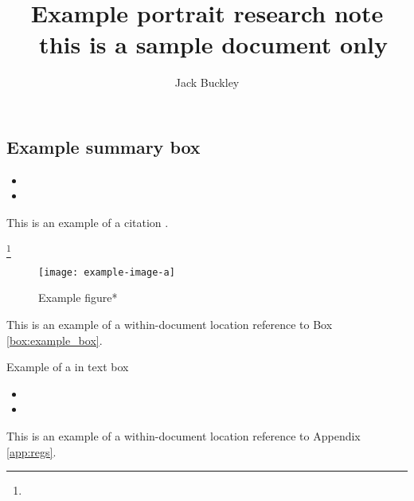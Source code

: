 \documentclass[10pt,openany,leqno]{e61-portrait-research-note}
\begin{document}
\baselineskip=14pt
\emergencystretch=5pt
\sloppy

\title{Example portrait research note ~\newline this is a sample document only}
\author{Jack Buckley}

\maketitle

\begin{summarybox}
\subsection*{Example summary box}\vspace{0.1cm}
\lipsum[][1-2]
\begin{itemize}[noitemsep]
    \item \lipsum[2][1]
    \item \lipsum[3][1]
\end{itemize}
\end{summarybox}

\lipsum[1] 

This is an example of a citation \parencite{Fitzgerald20,Ziffer20}.

\lipsum[2]\footnote{\lipsum[3]}

\begin{figure}[h]
\caption{Example figure*}
\label{fig:example_a}
\texttt{[image: example-image-a]}\centering
\end{figure}

This is an example of a within-document location reference to Box \ref{box:example_box}. 

\begin{Boxx}[label=box:example_box]{Example of a in text box}
\lipsum[][1-2]
\begin{itemize}[noitemsep]
    \item \lipsum[2][1]
    \item \lipsum[3][1]
\end{itemize}
\end{Boxx}

\lipsum[4] This is an example of a within-document location reference to Appendix \ref{app:regs}. 
\end{document}
